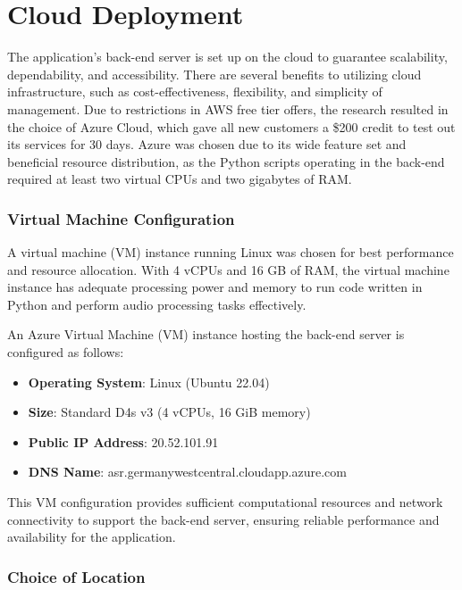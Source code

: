 \documentclass[conference]{IEEEtran}
\begin{document}
\section{Cloud Deployment}

The application's back-end server is set up on the cloud to guarantee scalability, dependability, and accessibility. There are several benefits to utilizing cloud infrastructure, such as cost-effectiveness, flexibility, and simplicity of management.
Due to restrictions in AWS free tier offers, the research resulted in the choice of Azure Cloud, which gave all new customers a \$200 credit to test out its services for 30 days. Azure was chosen due to its wide feature set and beneficial resource distribution, as the Python scripts operating in the back-end required at least two virtual CPUs and two gigabytes of RAM.



\subsubsection{Virtual Machine Configuration}

A virtual machine (VM) instance running Linux was chosen for best performance and resource allocation. With 4 vCPUs and 16 GB  of RAM, the virtual machine instance has adequate processing power and memory to run code written in Python and perform audio processing tasks effectively.

An Azure Virtual Machine (VM) instance hosting the back-end server is configured as follows:

\begin{itemize}
    \item \textbf{Operating System}: Linux (Ubuntu 22.04)
    \item \textbf{Size}: Standard D4s v3 (4 vCPUs, 16 GiB memory)
    \item \textbf{Public IP Address}: 20.52.101.91
    \item \textbf{DNS Name}: asr.germanywestcentral.cloudapp.azure.com
\end{itemize}

This VM configuration provides sufficient computational resources and network connectivity to support the back-end server, ensuring reliable performance and availability for the application.

\subsubsection{Choice of Location}
\end{document}
